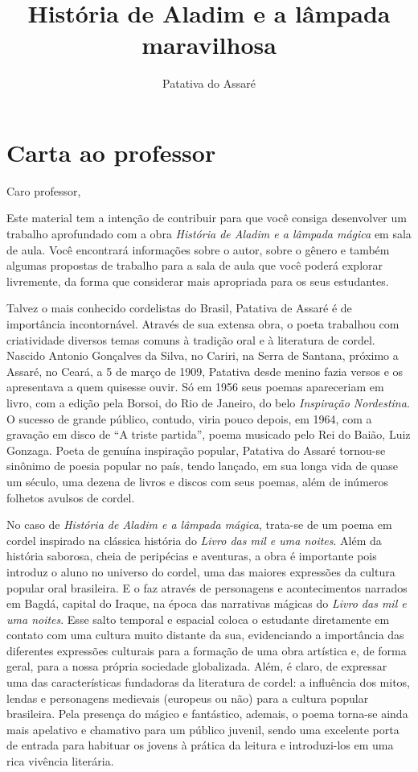 \documentclass[11pt]{extarticle}
\newcommand{\AutorLivro}{Patativa do Assaré}
\newcommand{\TituloLivro}{História de Aladim e a lâmpada maravilhosa}
\newcommand{\colaborador}{Paulo Pompermaier}
\begin{document}
\title{\TituloLivro}
\author{\AutorLivro}
\def\authornotes{\colaborador}

\date{}
\maketitle

\tableofcontents

\section{Carta ao professor}

Caro professor,

Este material tem a intenção de contribuir para que você consiga desenvolver um trabalho aprofundado com a obra \textit{História de Aladim e a lâmpada mágica} em sala de aula.
Você encontrará informações sobre o autor, sobre o gênero e também 
algumas propostas de trabalho para a sala de aula que você poderá explorar livremente, 
da forma que considerar mais apropriada para os seus estudantes.

Talvez o mais conhecido cordelistas do Brasil, Patativa de Assaré é de importância incontornável. Através de sua extensa obra, o poeta trabalhou com criatividade diversos temas comuns à tradição oral e à literatura de cordel.
Nascido Antonio Gonçalves da Silva, no Cariri, na Serra de Santana, próximo a Assaré,
no Ceará, a 5 de março de 1909, Patativa 
desde menino fazia versos e os apresentava a
quem quisesse ouvir. Só em 1956 seus poemas apareceriam em livro, com a edição
pela Borsoi, do Rio de Janeiro, do belo \textit{Inspiração Nordestina}. O
sucesso de grande público, contudo, viria pouco depois, em 1964, com a gravação
em disco de ``A triste partida'', poema musicado pelo Rei do Baião, Luiz
Gonzaga. Poeta de genuína inspiração popular, Patativa do Assaré tornou-se
sinônimo de poesia popular no país, tendo lançado, em sua longa vida de quase
um século, uma dezena de livros e discos com seus poemas, além de inúmeros
folhetos avulsos de cordel. 

No caso de \textit{História de Aladim e a lâmpada mágica}, trata-se de um poema em cordel inspirado na clássica história do \textit{Livro das mil e uma noites}.
Além da história saborosa, cheia de peripécias e aventuras, a obra é importante pois introduz o aluno no universo do cordel, uma das maiores expressões da cultura popular oral brasileira. E o faz através de personagens e acontecimentos narrados em Bagdá, capital do Iraque, na época das narrativas mágicas do \textit{Livro das mil e uma noites}. Esse salto temporal e espacial coloca o estudante diretamente em contato com uma cultura muito distante da sua, evidenciando a importância das diferentes expressões culturais para a formação de uma obra artística e, de forma geral, para a nossa própria sociedade globalizada. Além, é claro, de expressar uma das características fundadoras da literatura de cordel: a influência dos mitos, lendas e personagens medievais (europeus ou não) para a cultura popular brasileira. 
Pela presença do mágico e fantástico, ademais, o poema torna-se ainda mais apelativo e chamativo para um público juvenil, sendo uma excelente porta de entrada para habituar os jovens à prática da leitura e introduzi-los em uma rica vivência literária.
\end{document}
